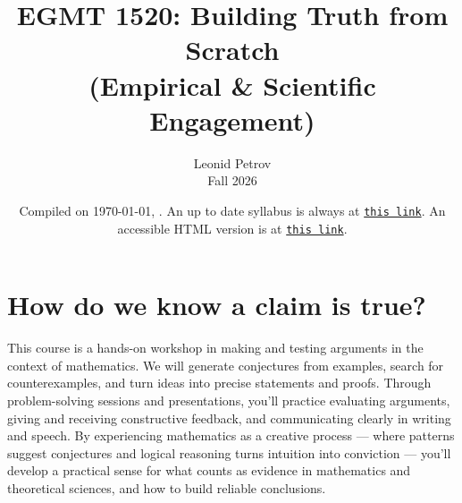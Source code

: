 \documentclass[oneside,11pt]{amsart}
\begin{document}
\title[Building Truth from Scratch]{EGMT 1520: Building Truth from Scratch\\(Empirical \& Scientific Engagement)}
\author{Leonid Petrov \\ Fall 2026}
\date{Compiled on \today, \currenttime. An up to date syllabus is always at \href{https://lpetrov.cc/teaching/Syllabus_EGMT_f26.pdf}{\texttt{this link}}. An accessible HTML version is at \href{https://lpetrov.cc/teaching/Syllabus_EGMT_f26.html}{\texttt{this link}}.}
\maketitle


\section{How do we know a claim is true?}

This course is a hands-on workshop in making and testing arguments in the context of mathematics.
We will generate conjectures from examples, search for counterexamples, and turn ideas into precise statements and proofs. Through problem-solving sessions and presentations, you'll practice evaluating arguments, giving and receiving constructive feedback, and communicating clearly in writing and speech. By experiencing mathematics as a creative process --- where patterns suggest conjectures and logical reasoning turns intuition into conviction --- you'll develop a practical sense for what counts as evidence in mathematics and theoretical sciences, and how to build reliable conclusions.
\end{document}
